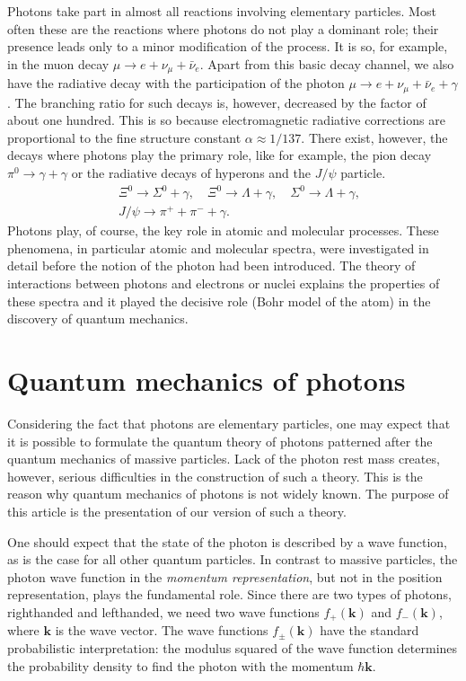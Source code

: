 \documentclass[onecolumn,aps,pra,12pt]{revtex4-1}
\begin{document}
Photons take part in almost all reactions involving elementary particles. Most often these are the reactions where photons do not play a dominant role; their presence leads only to a minor modification of the process. It is so, for example, in the muon decay $\mu\to e+\nu_\mu+\bar{\nu}_e$. Apart from this basic decay channel, we also have the radiative decay with the participation of the photon $\mu\to e+\nu_\mu+\bar{\nu}_e+\gamma$. The branching ratio for such decays is, however, decreased by the factor of about one hundred. This is so because electromagnetic radiative corrections are proportional to the fine structure constant $\alpha\approx 1/137$. There exist, however, the decays where photons play the primary role, like for example, the pion decay $\pi^0\to\gamma+\gamma$ or the radiative decays of hyperons and the $J/\psi$ particle.
\begin{align*}
\quad\Xi^0\to\Sigma^0+\gamma,\quad\Xi^0\to\Lambda+\gamma,
\quad\Sigma^0\to\Lambda+\gamma,\\
\quad J/\psi\to\pi^++\pi^-+\gamma.\hspace{2cm}
\end{align*}
Photons play, of course, the key role in atomic and molecular processes. These phenomena, in particular atomic and molecular spectra, were investigated in detail before the notion of the photon had been introduced. The theory of interactions between photons and electrons or nuclei explains the properties of these spectra and it played the decisive role (Bohr model of the atom) in the discovery of quantum mechanics.

\section{Quantum mechanics of photons}

Considering the fact that photons are elementary particles, one may expect that it is possible to formulate the quantum theory of photons patterned after the quantum mechanics of massive particles. Lack of the photon rest mass creates, however, serious difficulties in the construction of such a theory. This is the reason why quantum mechanics of photons is not widely known. The purpose of this article is the presentation of our version of such a theory.

One should expect that the state of the photon is described by a wave function, as is the case for all other quantum particles. In contrast to massive particles, the photon wave function in the {\em momentum representation}, but not in the position representation, plays the fundamental role. Since there are two types of photons, righthanded and lefthanded, we need two wave functions $f_+(\bm k)$ and $f_-(\bm k)$, where ${\bm k}$ is the wave vector. The wave functions $f_\pm(\bm k)$ have the standard probabilistic interpretation: the modulus squared of the wave function determines the probability density to find the photon with the momentum $\hbar{\bm k}$.
\end{document}
